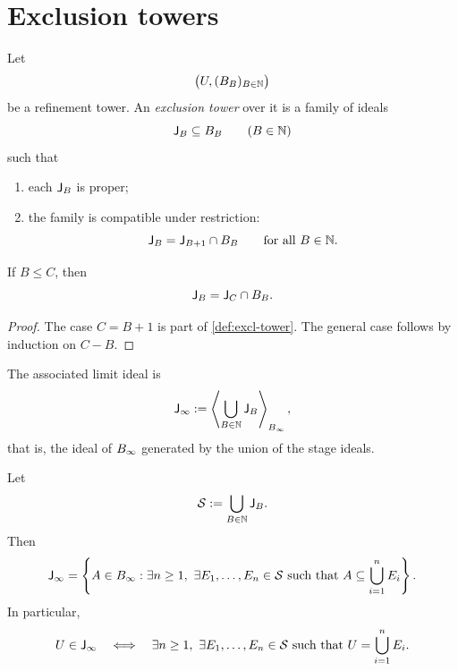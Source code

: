 \section{Exclusion towers}
\begin{definition}
	\label{def:excl-tower}
	Let
	\[
		\bigl(U,(B_B)_{B\in\mathbb N}\bigr)
	\]
	be a refinement tower. An \emph{exclusion tower} over it is a family of
	ideals
	\[
		\mathsf J_B\subseteq B_B
		\qquad
		(B\in\mathbb N)
	\]
	such that
	\begin{enumerate}[label=\textup{(\arabic*)}]
		\item each \(\mathsf J_B\) is proper;
		\item the family is compatible under restriction:
		      \[
			      \mathsf J_B=\mathsf J_{B+1}\cap B_B
			      \qquad
			      \text{for all }B\in\mathbb N.
		      \]
	\end{enumerate}
\end{definition}
\begin{lemma}
	\label{lem:iter-compat}
	If \(B\le C\), then
	\[
		\mathsf J_B=\mathsf J_C\cap B_B.
	\]
\end{lemma}
\begin{proof}
	The case \(C=B+1\) is part of \cref{def:excl-tower}. The general case
	follows by induction on \(C-B\).
\end{proof}
\begin{definition}
	The associated limit ideal is
	\[
		\mathsf J_\infty
		:=
		\left\langle
		\bigcup_{B\in\mathbb N}\mathsf J_B
		\right\rangle_{B_\infty},
	\]
	that is, the ideal of \(B_\infty\) generated by the union of the stage
	ideals.
\end{definition}
\begin{lemma}
	\label{lem:Jinf}
	Let
	\[
		\mathcal S:=\bigcup_{B\in\mathbb N}\mathsf J_B.
	\]
	Then
	\[
		\mathsf J_\infty
		=
		\left\{
		A\in B_\infty:
		\exists n\ge1,\ \exists E_1,\dots,E_n\in\mathcal S
		\text{ such that }
		A\subseteq \bigcup_{i=1}^n E_i
		\right\}.
	\]
	In particular,
	\[
		U\in\mathsf J_\infty
		\quad\Longleftrightarrow\quad
		\exists n\ge1,\ \exists E_1,\dots,E_n\in\mathcal S
		\text{ such that }
		U=\bigcup_{i=1}^n E_i.
	\]
\end{lemma}
